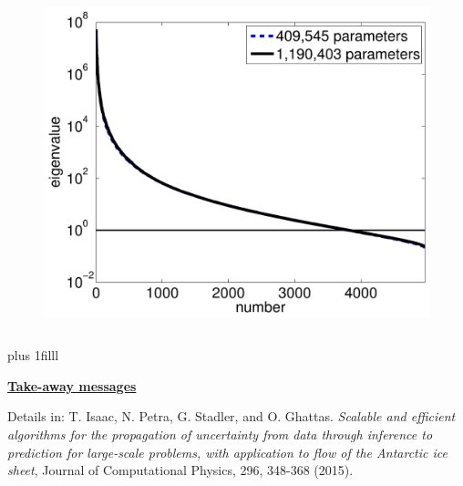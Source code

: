 \documentclass[10pt,final,xcolor=dvipsnames,aspect ratio=169]{beamer}
\newcommand{\btVFill}{\vskip0pt plus 1filll}
\begin{document}
\begin{frame}[t]
\begin{columns}
\begin{column}{0.49\paperwidth}
\begin{itemize}
				\begin{figure}[htb]
					\centering\includegraphics[width=0.5\columnwidth]{extraplots/spec_ppmisfit_hess_coarseandfine_new.pdf}
				\end{figure}
			\end{itemize}    	
		\end{column}
	\end{columns}
	\btVFill
	\only<3->
	{
		\begin{center} \textbf{\underline{Take-away messages}}
			\vspace{0.025in}
			
			
			\vspace{0.025in}
		\end{center} 
		\vspace{0.1in}
	}
	
	\scriptsize{Details in: T. Isaac, N. Petra, G. Stadler, and
		O. Ghattas. {\em Scalable and efficient algorithms for the
			propagation of uncertainty from data through inference to
			prediction for large-scale problems, with application to flow of
			the Antarctic ice sheet}, Journal of Computational Physics, 296,
		348-368 (2015).}	 
\end{frame}
\end{document}
